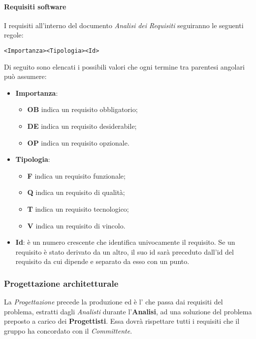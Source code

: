 \documentclass{scalatekids-article}
\begin{document}
\paragraph{Requisiti software}

\label{sec:adr}
I requisiti all'interno del documento \textit{Analisi dei Requisiti} seguiranno le seguenti regole:
\begin{center}
  \verb=<Importanza><Tipologia><Id>=
\end{center}
Di seguito sono elencati i possibili valori che ogni termine tra parentesi angolari può assumere:
\begin{itemize}
\item \textbf{Importanza}:
  \begin{itemize}
  \item \textbf{OB} indica un requisito obbligatorio;
  \item \textbf{DE} indica un requisito desiderabile;
  \item \textbf{OP} indica un requisito opzionale.
  \end{itemize}
\item \textbf{Tipologia}:
  \begin{itemize}
  \item \textbf{F} indica un requisito funzionale;
  \item \textbf{Q} indica un requisito di qualità;
  \item \textbf{T} indica un requisito tecnologico;
  \item \textbf{V} indica un requisito di vincolo.
  \end{itemize}
\item \textbf{Id}: è un numero crescente che identifica univocamente il
  requisito. Se un requisito è stato derivato da un altro, il suo id sarà
  preceduto dall'id del requisito da cui dipende e separato da esso con un
  punto.
\end{itemize}

\subsubsection{Progettazione architetturale}

La \textit{Progettazione} precede la produzione ed è l' che
passa dai requisiti del problema, estratti dagli \textit{Analisti} durante
l'\textbf{Analisi}, ad una soluzione del problema preposto a carico dei
\textbf{Progettisti}. Essa dovrà rispettare tutti i requisiti che il gruppo ha
concordato con il \textit{Committente}.\\
\end{document}
